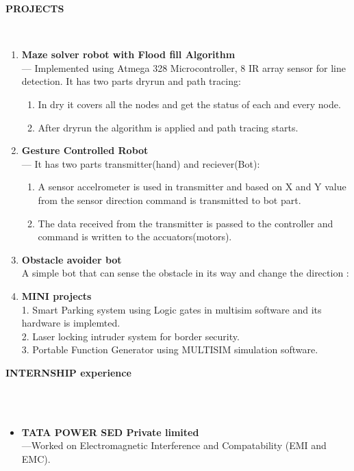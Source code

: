 \documentclass[a4paper,10pt]{article}
\newcommand{\lsep}{-0.5cm}
\newcommand{\resheading}[1]{{\small \colorbox{mygrey}{\begin{minipage}{0.975\textwidth}{\textbf{#1 \vphantom{p\^{E}}}}\end{minipage}}}}
\begin{document}
\resheading{\textbf{PROJECTS} }\\[\lsep]
\begin{enumerate}
\item \noindent \textbf{Maze solver robot with Flood fill Algorithm}\\
\indent --- Implemented using Atmega 328 Microcontroller, 8 IR array sensor for line detection. It has two parts dryrun and path tracing:
\begin{enumerate}
\item In dry it covers all the nodes and get the status of each and every node.
\item  After dryrun the algorithm is applied and path tracing starts.
\end{enumerate} 

\item\noindent\textbf{Gesture Controlled Robot}\\
\indent --- It has two parts transmitter(hand) and reciever(Bot):
\begin{enumerate}
\item  A sensor accelrometer is used in transmitter and based on X and Y value from the sensor direction command is transmitted to bot part.
\item The data received from the transmitter is passed to the controller and command is written to the accuators(motors).
\end{enumerate}

\item\noindent\textbf{Obstacle avoider bot }\\
\indent A simple bot that can sense the obstacle in its way and change the direction :


\item\noindent\textbf{MINI projects}\\
1. Smart Parking system using Logic gates in multisim software and its hardware is implemted.\\
2. Laser locking intruder system for border security.\\
3. Portable Function Generator using MULTISIM simulation software.
\end{enumerate}

\resheading{\textbf{INTERNSHIP experience} }\\\\[\lsep]
\begin{itemize}
\item\noindent\textbf{TATA POWER SED Private limited}\\
\indent ---Worked on Electromagnetic Interference and Compatability (EMI and EMC).
\end{itemize}
\end{document}
